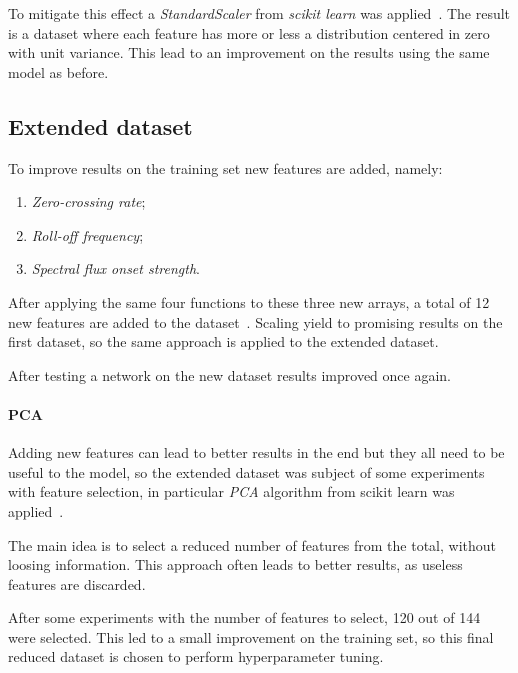 To mitigate this effect a \emph{StandardScaler} from \emph{scikit learn} was applied~\cite{scaler}\cite{scikitlearn}.
The result is a dataset where each feature has more or less a distribution 
centered in zero with unit variance.
This lead to an improvement on the results using the same
model as before. 

\subsection{Extended dataset}
\label{extended-dataset}

To improve results on the training set new features are added, namely: 
\begin{enumerate}
    \item \emph{Zero-crossing rate};
    \item \emph{Roll-off frequency};
    \item \emph{Spectral flux onset strength}.
\end{enumerate}
After applying the same four functions to these three new arrays, 
a total of 12 new features are added to the dataset~\cite{librosa-ex}.
Scaling yield to promising results on the first dataset, 
so the same approach is applied to the extended dataset.

After testing a network on the new dataset results improved once again.

\paragraph{PCA}
Adding new features can lead to better results 
in the end but they all need to be useful to the model, so 
the extended dataset was subject of some experiments with feature selection, 
in particular \emph{PCA} algorithm from scikit learn was applied~\cite{pca}.

The main idea is to select a reduced number of features from the total, 
without loosing information. This approach often leads to better results, 
as useless features are discarded.

After some experiments with the number of features to select, 120 out of 144
 were selected. This led to a small improvement on the training set, 
so this final reduced dataset is chosen to perform hyperparameter tuning.

\newpage